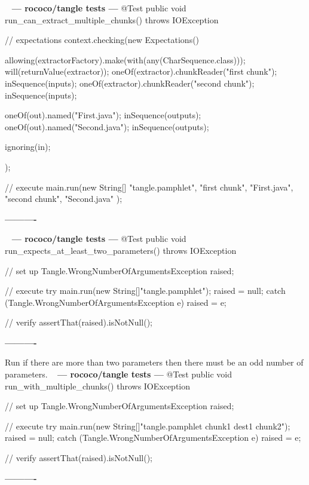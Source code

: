 \documentclass{book}
\newenvironment{chunk}[1]{%
{\ }\newline\noindent%
\hbox{\hskip 2.0cm}{\bf --- #1 ---}%
\verbatim}%                               say exactly what we see
{\endverbatim%
\par{}%
\noindent{}%
\hbox{\hskip 2.0cm}{\bf ----------}%
\par%
\normalsize\noindent}%
\begin{document}
\begin{chunk}{rococo/tangle tests}
@Test
public void run_can_extract_multiple_chunks() throws IOException {
    // expectations
    context.checking(new Expectations() {{
        allowing(extractorFactory).make(with(any(CharSequence.class)));
        will(returnValue(extractor));
        oneOf(extractor).chunkReader("first chunk");
        inSequence(inputs);
        oneOf(extractor).chunkReader("second chunk");
        inSequence(inputs);

        oneOf(out).named("First.java");
        inSequence(outputs);
        oneOf(out).named("Second.java");
        inSequence(outputs);

        ignoring(in);
    }});

    // execute
    main.run(new String[]{
            "tangle.pamphlet", 
            "first chunk", 
            "First.java", 
            "second chunk", 
            "Second.java"
    });
}
\end{chunk}

\begin{chunk}{rococo/tangle tests}
@Test
public void run_expects_at_least_two_parameters() throws IOException {
    // set up
    Tangle.WrongNumberOfArgumentsException raised;

    // execute
    try {
        main.run(new String[]{"tangle.pamphlet"});
        raised = null;
    } catch (Tangle.WrongNumberOfArgumentsException e) {
        raised = e;
    }

    // verify
    assertThat(raised).isNotNull();
}
\end{chunk}

Run if there are more than two parameters then there must be an odd number of parameters.
\begin{chunk}{rococo/tangle tests}
@Test
public void run_with_multiple_chunks() throws IOException {
    // set up
    Tangle.WrongNumberOfArgumentsException raised;

    // execute
    try {
        main.run(new String[]{"tangle.pamphlet chunk1 dest1 chunk2"});
        raised = null;
    } catch (Tangle.WrongNumberOfArgumentsException e) {
        raised = e;
    }

    // verify
    assertThat(raised).isNotNull();
}
\end{chunk}
\end{document}
